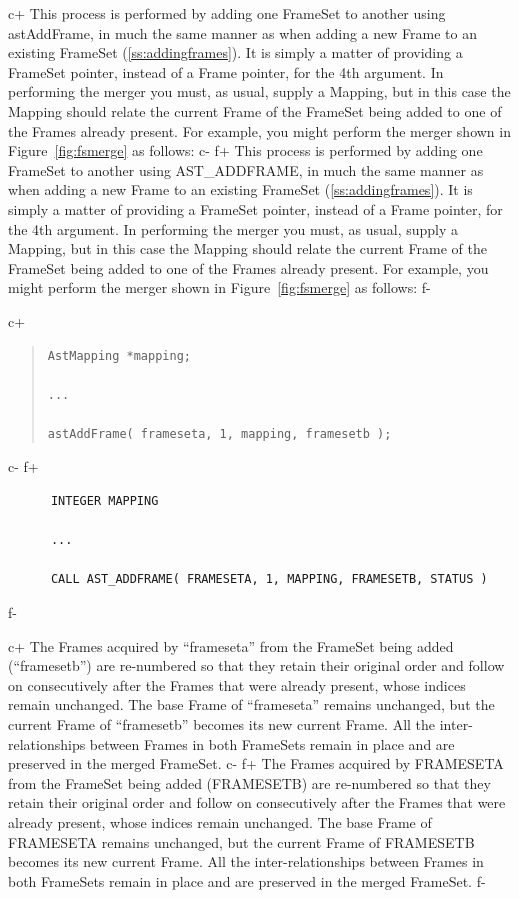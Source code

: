 \documentclass[twoside,11pt]{article}
\newcommand{\secref}[1]{\S\ref{#1}}
\renewcommand{\secref}[1]{\ref{#1}}
\begin{document}
c+
This process is performed by adding one FrameSet to another using
astAddFrame, in much the same manner as when adding a new Frame to an
existing FrameSet (\secref{ss:addingframes}). It is simply a matter of
providing a FrameSet pointer, instead of a Frame pointer, for the 4th
argument. In performing the merger you must, as usual, supply a
Mapping, but in this case the Mapping should relate the current Frame
of the FrameSet being added to one of the Frames already present. For
example, you might perform the merger shown in
Figure~\ref{fig:fsmerge} as follows:
c-
f+
This process is performed by adding one FrameSet to another using
AST\_ADDFRAME, in much the same manner as when adding a new Frame to
an existing FrameSet (\secref{ss:addingframes}). It is simply a matter
of providing a FrameSet pointer, instead of a Frame pointer, for the
4th argument. In performing the merger you must, as usual, supply a
Mapping, but in this case the Mapping should relate the current Frame
of the FrameSet being added to one of the Frames already present. For
example, you might perform the merger shown in
Figure~\ref{fig:fsmerge} as follows:
f-

c+
\begin{quote}
\small
\begin{verbatim}
AstMapping *mapping;

...

astAddFrame( frameseta, 1, mapping, framesetb );
\end{verbatim}
\normalsize
\end{quote}
c-
f+
\small
\begin{verbatim}
      INTEGER MAPPING

      ...

      CALL AST_ADDFRAME( FRAMESETA, 1, MAPPING, FRAMESETB, STATUS )
\end{verbatim}
\normalsize
f-

c+
The Frames acquired by ``frameseta'' from the FrameSet being added
(``framesetb'') are re-numbered so that they retain their original
order and follow on consecutively after the Frames that were already
present, whose indices remain unchanged. The base Frame of
``frameseta'' remains unchanged, but the current Frame of
``framesetb'' becomes its new current Frame. All the
inter-relationships between Frames in both FrameSets remain in place
and are preserved in the merged FrameSet.
c-
f+
The Frames acquired by FRAMESETA from the FrameSet being added
(FRAMESETB) are re-numbered so that they retain their original order
and follow on consecutively after the Frames that were already
present, whose indices remain unchanged. The base Frame of FRAMESETA
remains unchanged, but the current Frame of FRAMESETB becomes its new
current Frame. All the inter-relationships between Frames in both
FrameSets remain in place and are preserved in the merged FrameSet.
f-
\end{document}
